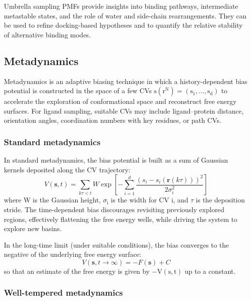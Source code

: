 \documentclass[12pt]{article}
\begin{document}
Umbrella sampling PMFs provide insights into binding pathways, intermediate metastable states, and the role of water and side-chain rearrangements. They can be used to refine docking-based hypotheses and to quantify the relative stability of alternative binding modes.

\subsection{Metadynamics}

Metadynamics is an adaptive biasing technique in which a history-dependent bias potential is constructed in the space of a few CVs $\textrm{s}(\textrm{r}^\textrm{N}) = (\textrm{s}_\textrm{1},\dots,\textrm{s}_\textrm{d})$ to accelerate the exploration of conformational space and reconstruct free energy surfaces\cite{CH9_LaioParrinello2002,CH9_Barducci2008}. For ligand sampling, suitable CVs may include ligand--protein distance, orientation angles, coordination numbers with key residues, or path CVs.

\subsubsection{Standard metadynamics}

In standard metadynamics, the bias potential is built as a sum of Gaussian kernels deposited along the CV trajectory:
\begin{equation}
V(\mathbf{s}, t) = \sum_{k\tau < t} W \exp\left[-\sum_{i=1}^{d} \frac{\left(s_i - s_i(\mathbf{r}(k\tau))\right)^2}{2\sigma_i^2}\right]
\label{eq:metMD}
\end{equation}
where W is the Gaussian height, $\sigma_\textrm{i}$ is the width for CV i, and $\tau$ is the deposition stride\cite{CH9_LaioParrinello2002}. The time-dependent bias discourages revisiting previously explored regions, effectively flattening the free energy wells, while driving the system to explore new basins.

In the long-time limit (under suitable conditions), the bias converges to the negative of the underlying free energy surface:
\begin{equation}
V(\mathbf{s},t\to\infty) = -F(\mathbf{s}) + C
\end{equation}
so that an estimate of the free energy is given by $-\textrm{V}(\textrm{s},\textrm{t})$ up to a constant.

\subsubsection{Well-tempered metadynamics}
\end{document}
